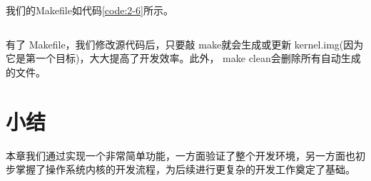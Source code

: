 \documentclass[main.tex]{subfiles}
\begin{document}
\begin{CJK*}{UTF8}{song}
\par
我们的Makefile如代码\ref{code:2-6}所示。
\begin{code}
\label{code:2-6}
\inputminted[linenos,numbersep=5pt,frame=lines,framesep=2mm]{make}{src/chapter02/kernel/Makefile}
\end{code}
有了 Makefile，我们修改源代码后，只要敲 make就会生成或更新 kernel.img(因为它是第一个目标)，大大提高了开发效率。此外， make clean会删除所有自动生成的文件。

\section{小结}
本章我们通过实现一个非常简单功能，一方面验证了整个开发环境，另一方面也初步掌握了操作系统内核的开发流程，为后续进行更复杂的开发工作奠定了基础。

\clearpage
\ifxetex\else\end{CJK*}\fi
\end{document}
